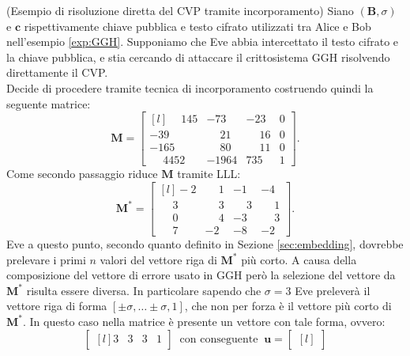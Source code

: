 \begin{exmp} (Esempio di risoluzione diretta del CVP tramite incorporamento)
\label{exp:embedding}
Siano $(\mathbf{B}, \sigma)$ e $\mathbf{c}$ rispettivamente chiave pubblica e testo cifrato
utilizzati tra Alice e Bob nell'esempio \ref{exp:GGH}. Supponiamo che Eve abbia intercettato 
il testo cifrato e la chiave pubblica, e stia cercando di attaccare il crittosistema GGH
risolvendo direttamente il CVP.\\ Decide di procedere tramite tecnica di incorporamento
costruendo quindi la seguente matrice:
\begin{equation*}
    \mathbf{M} =
    \begin{bmatrix*}[l]
        \phantom{-}145 & -73 & -23 & 0\\
        -39 & \phantom{-}21 & \phantom{-}16 & 0\\
        -165 & \phantom{-}80 & \phantom{-}11 & 0 \\
        \phantom{-}4452 & -1964 & 735 & 1
    \end{bmatrix*}.
\end{equation*}
Come secondo passaggio riduce $\mathbf{M}$ tramite LLL:
\begin{equation*}
    \mathbf{M}^* =
    \begin{bmatrix*}[l]
        -2           & \phantom{-}1  & -1 & -4\\
        \phantom{-}3 & \phantom{-}3  & \phantom{-}3 & \phantom{-}1\\
        \phantom{-}0 & \phantom{-}4  & -3 & \phantom{-}3 \\
        \phantom{-}7 & -2            & -8 & -2
    \end{bmatrix*}.
\end{equation*}
Eve a questo punto, secondo quanto definito in Sezione \ref{sec:embedding}, dovrebbe prelevare 
i primi $n$ valori del vettore riga di $\mathbf{M}^*$ più corto. A causa della composizione del
vettore di errore usato in GGH però la selezione del vettore da $\mathbf{M}^*$ risulta 
essere diversa. In particolare sapendo che $\sigma = 3$ Eve preleverà il vettore riga di 
forma $[\pm\sigma, \dots\pm\sigma,  1]$, che non per forza è il vettore più corto di $\mathbf{M}^*$.
In questo caso nella matrice è presente un vettore con tale forma, ovvero:
\begin{equation*}
    \begin{bmatrix*}[l]
        3 & 3 & 3 & 1
    \end{bmatrix*}
    \ \text{ con conseguente } \
    \mathbf{u} =
    \begin{bmatrix*}[l]

\end{bmatrix*}
\end{equation*}
\end{exmp}
